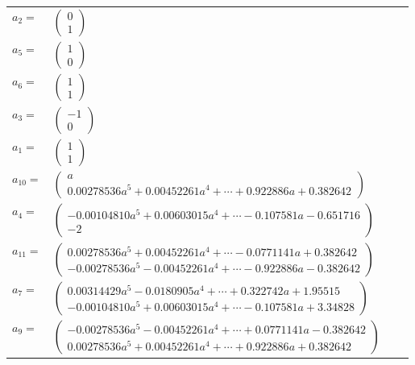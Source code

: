 \documentclass[1p]{elsarticle_modified}
\theoremstyle{definition}
\begin{document}
\begin{tabular}{m{7pt} m{180pt} m{7pt} m{180pt} }
\flushright $a_{2}=$&$\begin{pmatrix}0\\1\end{pmatrix}$ \\
\flushright $a_{5}=$&$\begin{pmatrix}1\\0\end{pmatrix}$ \\
\flushright $a_{6}=$&$\begin{pmatrix}1\\1\end{pmatrix}$ \\
\flushright $a_{3}=$&$\begin{pmatrix}-1\\0\end{pmatrix}$ \\
\flushright $a_{1}=$&$\begin{pmatrix}1\\1\end{pmatrix}$ \\
\flushright $a_{10}=$&$\begin{pmatrix}a\\0.00278536 a^{5}+0.00452261 a^{4}+\cdots+0.922886 a+0.382642\end{pmatrix}$ \\
\flushright $a_{4}=$&$\begin{pmatrix}-0.00104810 a^{5}+0.00603015 a^{4}+\cdots-0.107581 a-0.651716\\-2\end{pmatrix}$ \\
\flushright $a_{11}=$&$\begin{pmatrix}0.00278536 a^{5}+0.00452261 a^{4}+\cdots-0.0771141 a+0.382642\\-0.00278536 a^{5}-0.00452261 a^{4}+\cdots-0.922886 a-0.382642\end{pmatrix}$ \\
\flushright $a_{7}=$&$\begin{pmatrix}0.00314429 a^{5}-0.0180905 a^{4}+\cdots+0.322742 a+1.95515\\-0.00104810 a^{5}+0.00603015 a^{4}+\cdots-0.107581 a+3.34828\end{pmatrix}$ \\
\flushright $a_{9}=$&$\begin{pmatrix}-0.00278536 a^{5}-0.00452261 a^{4}+\cdots+0.0771141 a-0.382642\\0.00278536 a^{5}+0.00452261 a^{4}+\cdots+0.922886 a+0.382642\end{pmatrix}$ \\

\end{tabular}
\end{document}
